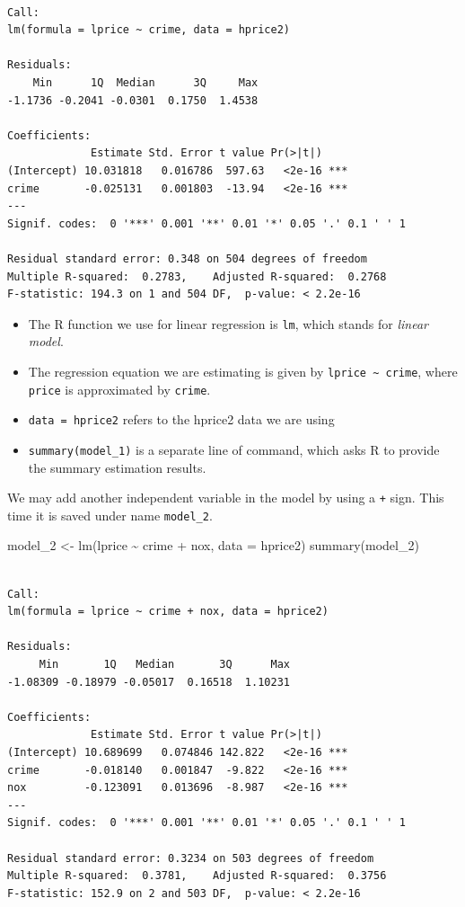 \documentclass[
  letterpaper,
  DIV=11,
  numbers=noendperiod]{scrreprt}
\newenvironment{Shaded}{\begin{snugshade}}{\end{snugshade}}
\newcommand{\AttributeTok}[1]{\textcolor[rgb]{0.40,0.45,0.13}{#1}}
\newcommand{\FunctionTok}[1]{\textcolor[rgb]{0.28,0.35,0.67}{#1}}
\newcommand{\NormalTok}[1]{\textcolor[rgb]{0.00,0.23,0.31}{#1}}
\newcommand{\OtherTok}[1]{\textcolor[rgb]{0.00,0.23,0.31}{#1}}
\newcommand{\SpecialCharTok}[1]{\textcolor[rgb]{0.37,0.37,0.37}{#1}}
\begin{document}
\begin{verbatim}

Call:
lm(formula = lprice ~ crime, data = hprice2)

Residuals:
    Min      1Q  Median      3Q     Max 
-1.1736 -0.2041 -0.0301  0.1750  1.4538 

Coefficients:
             Estimate Std. Error t value Pr(>|t|)    
(Intercept) 10.031818   0.016786  597.63   <2e-16 ***
crime       -0.025131   0.001803  -13.94   <2e-16 ***
---
Signif. codes:  0 '***' 0.001 '**' 0.01 '*' 0.05 '.' 0.1 ' ' 1

Residual standard error: 0.348 on 504 degrees of freedom
Multiple R-squared:  0.2783,    Adjusted R-squared:  0.2768 
F-statistic: 194.3 on 1 and 504 DF,  p-value: < 2.2e-16
\end{verbatim}

\begin{itemize}
\item
  The R function we use for linear regression is \texttt{lm}, which
  stands for \emph{linear model}.
\item
  The regression equation we are estimating is given by
  \texttt{lprice\ \textasciitilde{}\ crime}, where \texttt{price} is
  approximated by \texttt{crime}.
\item
  \texttt{data\ =\ hprice2} refers to the hprice2 data we are using
\item
  \texttt{summary(model\_1)} is a separate line of command, which asks R
  to provide the summary estimation results.
\end{itemize}

We may add another independent variable in the model by using a
\texttt{+} sign. This time it is saved under name \texttt{model\_2}.

\begin{Shaded}
\begin{Highlighting}[]
\NormalTok{model\_2 }\OtherTok{\textless{}{-}} \FunctionTok{lm}\NormalTok{(lprice }\SpecialCharTok{\textasciitilde{}}\NormalTok{ crime }\SpecialCharTok{+}\NormalTok{ nox, }\AttributeTok{data =}\NormalTok{ hprice2)}
\FunctionTok{summary}\NormalTok{(model\_2)}
\end{Highlighting}
\end{Shaded}

\begin{verbatim}

Call:
lm(formula = lprice ~ crime + nox, data = hprice2)

Residuals:
     Min       1Q   Median       3Q      Max 
-1.08309 -0.18979 -0.05017  0.16518  1.10231 

Coefficients:
             Estimate Std. Error t value Pr(>|t|)    
(Intercept) 10.689699   0.074846 142.822   <2e-16 ***
crime       -0.018140   0.001847  -9.822   <2e-16 ***
nox         -0.123091   0.013696  -8.987   <2e-16 ***
---
Signif. codes:  0 '***' 0.001 '**' 0.01 '*' 0.05 '.' 0.1 ' ' 1

Residual standard error: 0.3234 on 503 degrees of freedom
Multiple R-squared:  0.3781,    Adjusted R-squared:  0.3756 
F-statistic: 152.9 on 2 and 503 DF,  p-value: < 2.2e-16
\end{verbatim}
\end{document}
